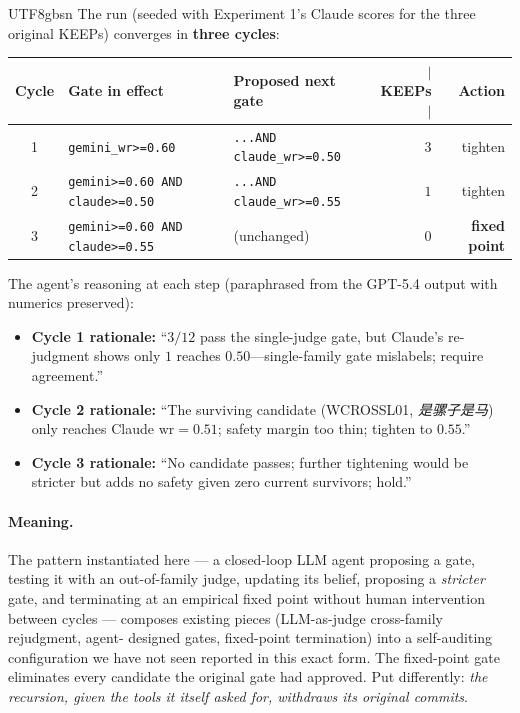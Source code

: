 \documentclass{article}
\begin{document}
\begin{CJK*}{UTF8}{gbsn}
\noindent The run (seeded with Experiment 1's Claude scores for the
three original KEEPs) converges in \textbf{three cycles}:

\begin{center}\small
\begin{tabular}{c l l r r}
  \toprule
  Cycle & Gate in effect & Proposed next gate & \(|\)KEEPs\(|\)
    & Action \\
  \midrule
  1 & \texttt{gemini\_wr>=0.60} &
      \texttt{...AND claude\_wr>=0.50} & \(3\) & tighten \\
  2 & \texttt{gemini>=0.60 AND claude>=0.50} &
      \texttt{...AND claude\_wr>=0.55} & \(1\) & tighten \\
  3 & \texttt{gemini>=0.60 AND claude>=0.55} &
      (unchanged) & \(0\) & \textbf{fixed point} \\
  \bottomrule
\end{tabular}
\end{center}

\noindent The agent's reasoning at each step (paraphrased from the
GPT-5.4 output with numerics preserved):

\begin{itemize}[leftmargin=*, topsep=2pt, itemsep=2pt]
  \item \textbf{Cycle 1 rationale:} ``\(3/12\) pass the single-judge
    gate, but Claude's re-judgment shows only \(1\) reaches
    \(0.50\)—single-family gate mislabels; require agreement.''
  \item \textbf{Cycle 2 rationale:} ``The surviving candidate
    (WCROSSL01, \emph{是骡子是马}) only reaches Claude
    \(\text{wr} = 0.51\); safety margin too thin; tighten to
    \(0.55\).''
  \item \textbf{Cycle 3 rationale:} ``No candidate passes; further
    tightening would be stricter but adds no safety given zero
    current survivors; hold.''
\end{itemize}

\paragraph{Meaning.} The pattern instantiated here --- a
closed-loop LLM agent proposing a gate, testing it with an
out-of-family judge, updating its belief, proposing a
\emph{stricter} gate, and terminating at an empirical fixed
point without human intervention between cycles --- composes
existing pieces (LLM-as-judge cross-family rejudgment, agent-
designed gates, fixed-point termination) into a self-auditing
configuration we have not seen reported in this exact form. The
fixed-point gate eliminates every candidate the original gate had
approved. Put differently: \emph{the recursion, given the tools it
itself asked for, withdraws its original commits}.


\end{CJK*}
\end{document}
